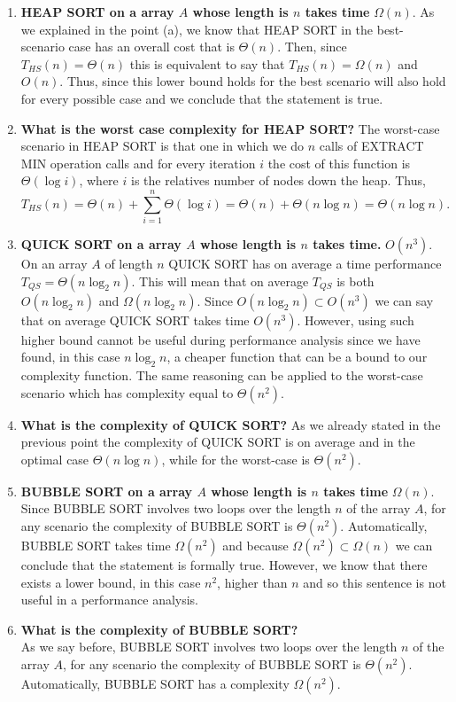 \documentclass{article}
\begin{document}
\begin{enumerate}[label=(\alph*)]
		 
		\item \textbf{HEAP SORT on a array $A$ whose length is $n$ takes time} $\Omega(n)$. 
		As we explained in the point (a), we know that HEAP SORT in the best-scenario case has an overall cost that is $\Theta(n)$. Then, since $T_{HS} (n) = \Theta(n)$ this is equivalent to say that  $T_{HS} (n) = \Omega(n)$ and $O(n)$. Thus, since this lower bound holds for the best scenario will also hold for every possible case and we conclude that the statement is true. 
		\item \textbf{What is the worst case complexity for HEAP SORT?}
		The worst-case scenario in HEAP SORT is that one in which we do $n$ calls of EXTRACT MIN operation calls and for every iteration $i$ the cost of this function is $\Theta(\log i)$, where $i$ is the relatives number of nodes down the heap. Thus,
		\begin{equation*}
		T_{HS} (n) = \Theta(n) + \sum_{i=1}^{n} \Theta(\log i) = \Theta(n) + \Theta(n\log n) = \Theta(n\log n).  
		\end{equation*}
		\item \textbf{QUICK SORT on a array $A$ whose length is $n$ takes time.} $O(n^3)$. 
		On an array $A$ of length $n$ QUICK SORT has on average a time performance $T_{QS} = \Theta(n \log_2 n) $.  This will mean that on average $T_{QS}$ is both $O(n\log_2 n)$ and $\Omega(n\log_2 n)$. Since $O(n\log_2 n) \subset O(n^3)$ we can say that on  average QUICK SORT takes time $O(n^3)$. However, using such higher bound cannot be useful during performance analysis since we have found, in this case $n\log_2 n$, a cheaper function that can be a bound to our complexity function. 
		The same reasoning can be applied to the worst-case scenario which has complexity equal to $\Theta(n^2) $.
		\item \textbf{What is the complexity of QUICK SORT?}
		As we already stated in the previous point the complexity of QUICK SORT is on average and in the optimal case $\Theta(n\log n)$, while for the worst-case is $\Theta(n^2)$.
		\item \textbf{BUBBLE SORT on a array $A$ whose length is $n$ takes time} $\Omega(n)$.
		Since BUBBLE SORT involves two loops over the length $n$ of the array $A$, for any scenario the complexity of BUBBLE SORT is $\Theta(n^2)$. Automatically, BUBBLE SORT takes time $\Omega(n^2)$ and because $\Omega(n^2) \subset \Omega(n) $ we can conclude that the statement is formally true. However, we know that there exists a lower bound, in this case $n^2$, higher than $n$ and so this sentence is not useful in a performance analysis. 
		\item  \textbf{What is the complexity of BUBBLE SORT?} \\
		As we say before,  BUBBLE SORT involves two loops over the length $n$ of the array $A$, for any scenario the complexity of BUBBLE SORT is $\Theta(n^2)$. Automatically, BUBBLE SORT has a complexity $\Omega(n^2)$.
	\end{enumerate}
\end{document}
